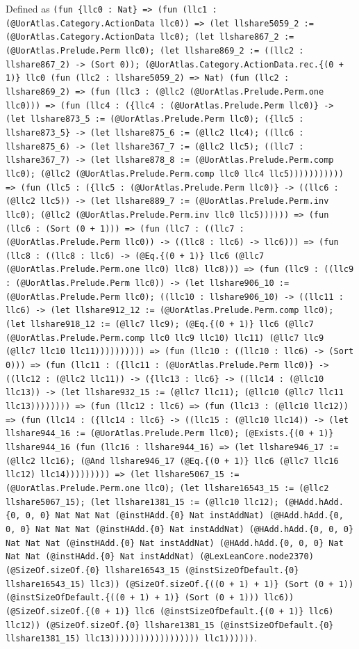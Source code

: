 \documentclass[11pt]{article}
\begin{document}
\noindent Defined as \texttt{(fun \{llc0 : Nat\} => (fun (llc1 : (@UorAtlas.Category.ActionData llc0)) => (let llshare5059\_2 := (@UorAtlas.Category.ActionData llc0); (let llshare867\_2 := (@UorAtlas.Prelude.Perm llc0); (let llshare869\_2 := ((llc2 : llshare867\_2) -> (Sort 0)); (@UorAtlas.Category.ActionData.rec.\{(0 + 1)\} llc0 (fun (llc2 : llshare5059\_2) => Nat) (fun (llc2 : llshare869\_2) => (fun (llc3 : (@llc2 (@UorAtlas.Prelude.Perm.one llc0))) => (fun (llc4 : (\{llc4 : (@UorAtlas.Prelude.Perm llc0)\} -> (let llshare873\_5 := (@UorAtlas.Prelude.Perm llc0); (\{llc5 : llshare873\_5\} -> (let llshare875\_6 := (@llc2 llc4); ((llc6 : llshare875\_6) -> (let llshare367\_7 := (@llc2 llc5); ((llc7 : llshare367\_7) -> (let llshare878\_8 := (@UorAtlas.Prelude.Perm.comp llc0); (@llc2 (@UorAtlas.Prelude.Perm.comp llc0 llc4 llc5))))))))))) => (fun (llc5 : (\{llc5 : (@UorAtlas.Prelude.Perm llc0)\} -> ((llc6 : (@llc2 llc5)) -> (let llshare889\_7 := (@UorAtlas.Prelude.Perm.inv llc0); (@llc2 (@UorAtlas.Prelude.Perm.inv llc0 llc5)))))) => (fun (llc6 : (Sort (0 + 1))) => (fun (llc7 : ((llc7 : (@UorAtlas.Prelude.Perm llc0)) -> ((llc8 : llc6) -> llc6))) => (fun (llc8 : ((llc8 : llc6) -> (@Eq.\{(0 + 1)\} llc6 (@llc7 (@UorAtlas.Prelude.Perm.one llc0) llc8) llc8))) => (fun (llc9 : ((llc9 : (@UorAtlas.Prelude.Perm llc0)) -> (let llshare906\_10 := (@UorAtlas.Prelude.Perm llc0); ((llc10 : llshare906\_10) -> ((llc11 : llc6) -> (let llshare912\_12 := (@UorAtlas.Prelude.Perm.comp llc0); (let llshare918\_12 := (@llc7 llc9); (@Eq.\{(0 + 1)\} llc6 (@llc7 (@UorAtlas.Prelude.Perm.comp llc0 llc9 llc10) llc11) (@llc7 llc9 (@llc7 llc10 llc11)))))))))) => (fun (llc10 : ((llc10 : llc6) -> (Sort 0))) => (fun (llc11 : (\{llc11 : (@UorAtlas.Prelude.Perm llc0)\} -> ((llc12 : (@llc2 llc11)) -> (\{llc13 : llc6\} -> ((llc14 : (@llc10 llc13)) -> (let llshare932\_15 := (@llc7 llc11); (@llc10 (@llc7 llc11 llc13)))))))) => (fun (llc12 : llc6) => (fun (llc13 : (@llc10 llc12)) => (fun (llc14 : (\{llc14 : llc6\} -> ((llc15 : (@llc10 llc14)) -> (let llshare944\_16 := (@UorAtlas.Prelude.Perm llc0); (@Exists.\{(0 + 1)\} llshare944\_16 (fun (llc16 : llshare944\_16) => (let llshare946\_17 := (@llc2 llc16); (@And llshare946\_17 (@Eq.\{(0 + 1)\} llc6 (@llc7 llc16 llc12) llc14))))))))) => (let llshare5067\_15 := (@UorAtlas.Prelude.Perm.one llc0); (let llshare16543\_15 := (@llc2 llshare5067\_15); (let llshare1381\_15 := (@llc10 llc12); (@HAdd.hAdd.\{0, 0, 0\} Nat Nat Nat (@instHAdd.\{0\} Nat instAddNat) (@HAdd.hAdd.\{0, 0, 0\} Nat Nat Nat (@instHAdd.\{0\} Nat instAddNat) (@HAdd.hAdd.\{0, 0, 0\} Nat Nat Nat (@instHAdd.\{0\} Nat instAddNat) (@HAdd.hAdd.\{0, 0, 0\} Nat Nat Nat (@instHAdd.\{0\} Nat instAddNat) (@LexLeanCore.node2370) (@SizeOf.sizeOf.\{0\} llshare16543\_15 (@instSizeOfDefault.\{0\} llshare16543\_15) llc3)) (@SizeOf.sizeOf.\{((0 + 1) + 1)\} (Sort (0 + 1)) (@instSizeOfDefault.\{((0 + 1) + 1)\} (Sort (0 + 1))) llc6)) (@SizeOf.sizeOf.\{(0 + 1)\} llc6 (@instSizeOfDefault.\{(0 + 1)\} llc6) llc12)) (@SizeOf.sizeOf.\{0\} llshare1381\_15 (@instSizeOfDefault.\{0\} llshare1381\_15) llc13)))))))))))))))))) llc1))))))}.\par
\end{document}
